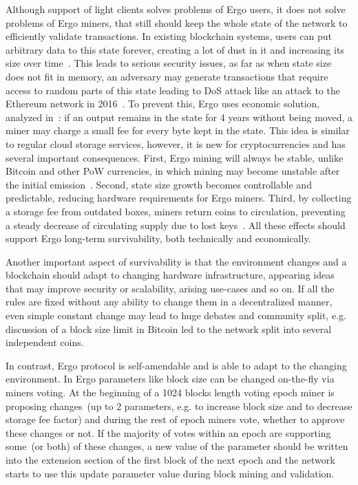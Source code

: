 Although support of light clients solves problems of Ergo users, it does not solve problems
of Ergo miners, that still should keep the whole state of the network to efficiently validate
transactions.
In existing blockchain systems, users can put arbitrary data to this state forever,
creating a lot of dust in it and increasing its size over time~\cite{bitcoin utxo dust}.
This leads to serious security issues, as far as when state size does not fit in memory,
an adversary may generate transactions that require access to random parts of this state
leading to DoS attack like an attack to the Ethereum network in 2016~\cite{??}.
To prevent this, Ergo uses economic solution, analyzed in~\cite{chepurnoy2018systematic}: if an
output remains in the state for 4 years without being moved, a miner may charge a small fee for every
byte kept in the state.
This idea is similar to regular cloud storage services, however, it is new for
cryptocurrencies and has several important consequences.
First, Ergo mining will always be stable, unlike Bitcoin and other PoW currencies, in which mining may become unstable after the
initial emission~\cite{carlsten2016instability}.
Second, state size growth becomes controllable and predictable, reducing hardware requirements for Ergo miners.
Third, by collecting a storage fee from outdated boxes, miners return coins to circulation, preventing a steady decrease
of circulating supply due to lost keys~\cite{wsj2018}.
All these effects should support Ergo long-term survivability, both technically and economically.

Another important aspect of survivability is that the environment changes and a blockchain should
adapt to changing hardware infrastructure, appearing ideas that may improve security or
scalability, arising use-cases and so on.
If all the rules are fixed without any ability to change them in a decentralized manner, even
simple constant change may lead to huge debates and community split, e.g. discussion of a block
size limit in Bitcoin led to the network split into several independent coins.

In contrast, Ergo protocol is self-amendable and is able to adapt to the changing environment.
In Ergo parameters like block size can be changed on-the-fly via miners voting.
At the beginning of a 1024 blocks length voting epoch miner is proposing changes~(up to 2 parameters,
e.g. to increase block size and to decrease storage fee factor) and during the rest of epoch miners
vote, whether to approve these changes or not.
If the majority of votes within an epoch are supporting some~(or both) of these changes, a new value of the
parameter should be written into the extension section of the first block of the next epoch and the
network starts to use this update parameter value during block mining and validation.

